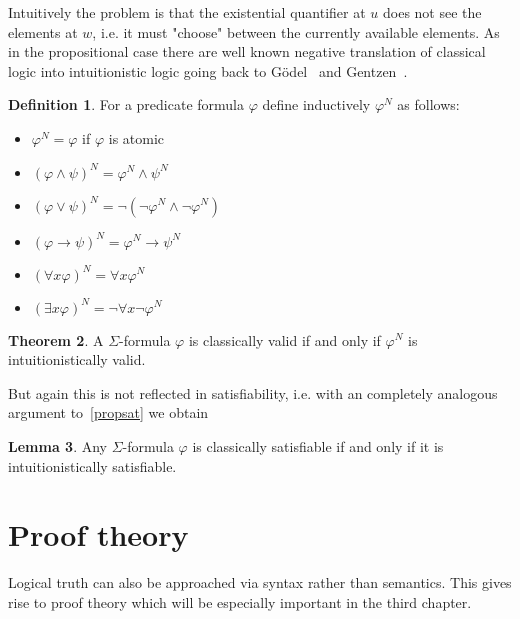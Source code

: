 \documentclass[a4paper,12pt]{report}
\theoremstyle{definition}
\newtheorem{theorem}{Theorem}[section]
\theoremstyle{definition}
\theoremstyle{definition}
\newtheorem{lemma}[theorem]{Lemma}
\theoremstyle{definition}
\theoremstyle{definition}
\newtheorem{definition}[theorem]{Definition}
\theoremstyle{definition}
\theoremstyle{definition}
\begin{document}
	Intuitively the problem is that the existential quantifier at $u$ does not see the elements at $w$, i.e. it must "choose" between the currently available elements. As in the propositional case there are well known negative translation of classical logic into intuitionistic logic going back to G\"odel~\cite{godel1933intuitionistischen} and Gentzen~\cite{gentzen1936widerspruchsfreiheit}.
	
	\begin{definition}
		For a predicate formula $\varphi$ define inductively $\varphi^N$ as follows:
		\begin{itemize}
			\item $\varphi^N = \varphi$ if $\varphi$ is atomic
			\item $(\varphi\wedge\psi)^N = \varphi^N\wedge\psi^N$
			\item $(\varphi\vee\psi)^N = \neg(\neg\varphi^N\wedge\neg\varphi^N)$
			\item $(\varphi\to\psi)^N = \varphi^N\to\psi^N$
			\item $(\forall x\varphi)^N = \forall x\varphi^N$
			\item $(\exists x\varphi)^N = \neg\forall x\neg\varphi^N$
		\end{itemize}
	\end{definition}
	\begin{theorem}
		A $\Sigma$-formula $\varphi$ is classically valid if and only if $\varphi^N$ is intuitionistically valid.
	\end{theorem}
	
	But again this is not reflected in satisfiability, i.e. with an completely analogous argument to~\ref{propsat} we obtain
	
	\begin{lemma}
		Any $\Sigma$-formula $\varphi$ is classically satisfiable if and only if it is intuitionistically satisfiable.
	\end{lemma}
	
	\section{Proof theory}
	
	Logical truth can also be approached via syntax rather than semantics. This gives rise to proof theory which will be especially important in the third chapter.
		
\end{document}
